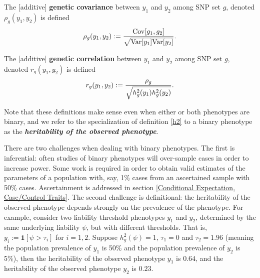 \documentclass[11pt]{article}
\numberwithin{equation}{section}
\numberwithin{definition}{section}
\numberwithin{thm}{section}
\numberwithin{lemma}{section}
\numberwithin{prop}{section}
\numberwithin{cor}{section}
\numberwithin{hyp}{section}
\begin{document}
\begin{definition}  
The [additive] \textbf{genetic covariance} between $y_1$ and $y_2$ among SNP set $g$, 
denoted $\rho_g(y_1, y_2)$ is defined
\begin{equation}
\rho_g(y_1, y_2) := \frac{\mathrm{Cov}[g_1,g_2]}{\sqrt{\mathrm{Var}[y_1]\mathrm{Var}[y_2]}}.
\end{equation}
\end{definition}

\begin{definition}  
The [additive] \textbf{genetic correlation} between $y_1$ and $y_2$ among SNP set $g$, 
denoted $r_g(y_1, y_2)$ is defined
\begin{equation}
r_g(y_1, y_2) := \dfrac{\rho_g}{\sqrt{h^2_g(y_1)h^2_g(y_2)}}.
\end{equation}
\end{definition}

Note that these definitions make sense even when either or both phenotypes are binary,
and we refer to the specialization of definition \ref{h2} to a binary phenotype as 
the \textbf{\emph{heritability of the observed phenotype}}.

There are two challenges when dealing with binary phenotypes. 
The first is inferential:
often studies of binary phenotypes will over-sample cases in order to increase power.
Some work is required in order to obtain valid estimates of the parameters of a population with, say, 1\% cases 
from an ascertained sample with 50\% cases.
Ascertainment is addressed in section \ref{Conditional Expectation, Case/Control Traits}.
The second challenge is definitional: the heritability of the observed phenotype depends strongly on the prevalence of the
phenotype. 
For example, consider two liability threshold phenotypes $y_1$ and $y_2$, 
determined by the same underlying liability $\psi$, but with different thresholds. 
That is, $y_i := \mathbf{1}[\psi > \tau_i]$ for $i=1,2$.
Suppose $h^2_g(\psi)=1$, $\tau_1 = 0$ and $\tau_2 = 1.96$ 
(meaning the population prevalence of $y_1$ is 50\% and the population prevalence of $y_2$ is 5\%),
then the heritability of the observed phenotype $y_1$ is $0.64$,
and the heritability of the observed phenotype $y_2$ is $0.23$.
\end{document}
